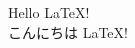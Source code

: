\documentclass[11pt,a4paper]{bxjsarticle}
\begin{document}
Hello \LaTeX !\\
こんにちは \LaTeX !
\end{document}
